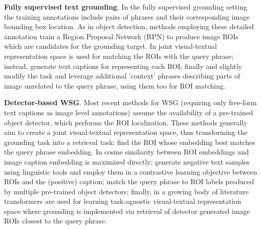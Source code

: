 \documentclass[10pt,twocolumn,letterpaper]{article}
\begin{document}
\noindent\textbf{Fully supervised text grounding}.
In the fully supervised grounding setting the training annotations include pairs of phrases and their corresponding image bounding box location. As in object detection, methods employing these detailed annotation train a Region Proposal Network (RPN) to produce image ROIs which are candidates for the grounding target. In \cite{plummer2015flickr30k} joint visual-textual representation space is used for matching the ROIs with the query phrase; instead, \cite{Mao_2016_CVPR} generate text captions for representing each ROI; finally \cite{chen2017msrc} and \cite{chen2017query} slightly modify the task and leverage additional 'context' phrases describing parts of image unrelated to the query phrase, using them too for ROI matching.

\noindent\textbf{Detector-based WSG}.
Most recent methods for WSG (requiring only free-form text captions as image level annotations) assume the availability of a pre-trained object detector, which performs the ROI localization. These methods generally aim to create a joint visual-textual representation space, thus transforming the grounding task into a retrieval task: find the ROI whose embedding best matches the query phrase embedding. 
In \cite{datta2019align2ground} cosine similarity between ROI embeddings and image caption embedding is maximized directly;
\cite{gupta2020contrastive} generate negative text samples using linguistic tools and employ them in a contrastive learning objective between ROIs and the (positive) caption;
\cite{wang2019phrase} match the query phrase to ROI labels produced by multiple pre-trained object detectors;
finally, in a growing body of literature \cite{chen2020uniter, huang2020pixel, li2020unicoder, li2019visualbert, li2020weakly, lu2019vilbert, lu202012, su2019vl, sun2019videobert, tan2019lxmert, zhou2020unified} transformers are used for learning task-agnostic visual-textual representation space where grounding is implemented via retrieval of detector generated image ROIs closest to the query phrase.
\end{document}
